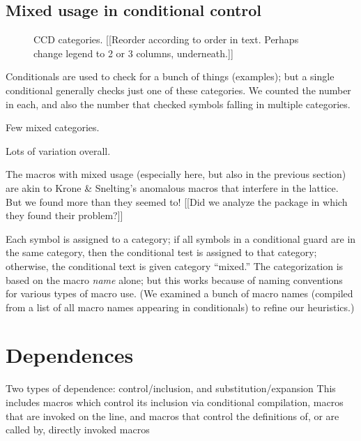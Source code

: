 \documentclass[10pt]{article}
\begin{document}
\subsection{Mixed usage in conditional control}

\begin{figure}
\centerline{}
\caption{CCD categories.  [[Reorder according to order in text.  Perhaps
  change legend to 2 or 3 columns, underneath.]]}
\label{fig:ccd-categories}
\end{figure}


    Conditionals are used to check for a bunch of things (examples); but a
      single conditional generally checks just one of these categories.  We
      counted the number in each, and also the number that checked symbols
      falling in multiple categories.

    Few mixed categories.

    Lots of variation overall.

    The macros with mixed usage (especially here, but also in the previous
      section) are akin to Krone \& Snelting's anomalous macros that
      interfere in the lattice.  But we found more than they seemed to!
      [[Did we analyze the package in which they found their problem?]]
      
      Each symbol is assigned to a category; if all symbols in a
      conditional guard are in the same category, then the conditional test
      is assigned to that category; otherwise, the conditional text is
      given category ``mixed.''  The categorization is based on the macro
      {\em name} alone; but this works because of naming conventions for
      various types of macro use.  (We examined a bunch of macro names
      (compiled from a list of all macro names appearing in conditionals)
      to refine our heuristics.)


{}


\section{Dependences}
\label{sec:dependence}
\label{sec:last-content-section}

 Two types of dependence:  control/inclusion, and substitution/expansion
     This includes macros which control its inclusion via conditional
     compilation, macros that are invoked on the line, and macros that
     control the definitions of, or are called by, directly invoked macros
\end{document}
